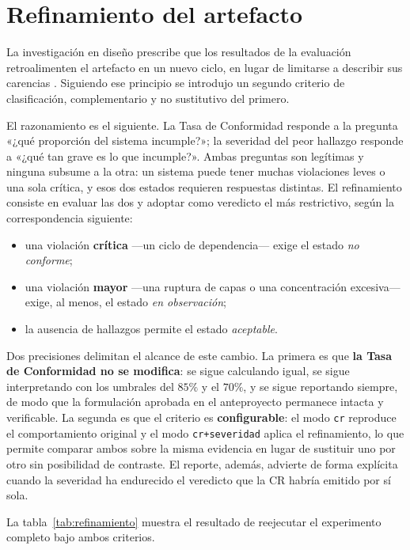 \section{Refinamiento del artefacto}
La investigación en diseño prescribe que los resultados de la evaluación retroalimenten el artefacto en un nuevo ciclo, en lugar de limitarse a describir sus carencias \citep{Hevner2004, Peffers2007}. Siguiendo ese principio se introdujo un segundo criterio de clasificación, complementario y no sustitutivo del primero.

El razonamiento es el siguiente. La Tasa de Conformidad responde a la pregunta «¿qué proporción del sistema incumple?»; la severidad del peor hallazgo responde a «¿qué tan grave es lo que incumple?». Ambas preguntas son legítimas y ninguna subsume a la otra: un sistema puede tener muchas violaciones leves o una sola crítica, y esos dos estados requieren respuestas distintas. El refinamiento consiste en evaluar las dos y adoptar como veredicto el más restrictivo, según la correspondencia siguiente:

\begin{itemize}
    \item una violación \textbf{crítica} ---un ciclo de dependencia--- exige el estado \textit{no conforme};
    \item una violación \textbf{mayor} ---una ruptura de capas o una concentración excesiva--- exige, al menos, el estado \textit{en observación};
    \item la ausencia de hallazgos permite el estado \textit{aceptable}.
\end{itemize}

Dos precisiones delimitan el alcance de este cambio. La primera es que \textbf{la Tasa de Conformidad no se modifica}: se sigue calculando igual, se sigue interpretando con los umbrales del $85\%$ y el $70\%$, y se sigue reportando siempre, de modo que la formulación aprobada en el anteproyecto permanece intacta y verificable. La segunda es que el criterio es \textbf{configurable}: el modo \texttt{cr} reproduce el comportamiento original y el modo \texttt{cr+severidad} aplica el refinamiento, lo que permite comparar ambos sobre la misma evidencia en lugar de sustituir uno por otro sin posibilidad de contraste. El reporte, además, advierte de forma explícita cuando la severidad ha endurecido el veredicto que la CR habría emitido por sí sola.

La tabla~\ref{tab:refinamiento} muestra el resultado de reejecutar el experimento completo bajo ambos criterios.

